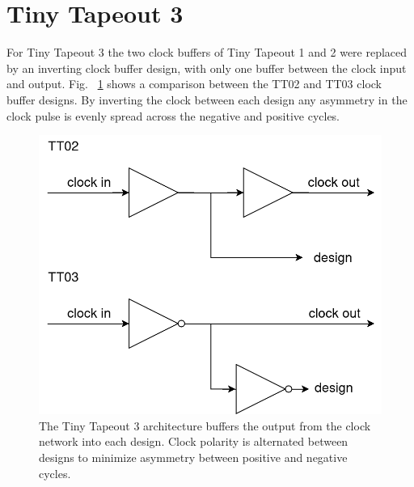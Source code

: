 \section{Tiny Tapeout 3}
\label{sec:tinytapeout3}

For Tiny Tapeout 3 the two clock buffers of Tiny Tapeout 1 and 2 were replaced by an inverting clock buffer design, with only one buffer between the clock input and output. Fig. ~\ref{fig:TT02_vs_TT03} shows a comparison between the TT02 and TT03 clock buffer designs. By inverting the clock between each design any asymmetry in the clock pulse is evenly spread across the negative and positive cycles.

\begin{figure}[!t]
\centering
\includegraphics[width=\columnwidth]{./Figs/tt02 vs tt03 scanchain clock.png}
\caption{The Tiny Tapeout 3 architecture buffers the output from the clock network into each design. Clock polarity is alternated between designs to minimize asymmetry between positive and negative cycles.}
\label{fig:TT02_vs_TT03}
\end{figure}

